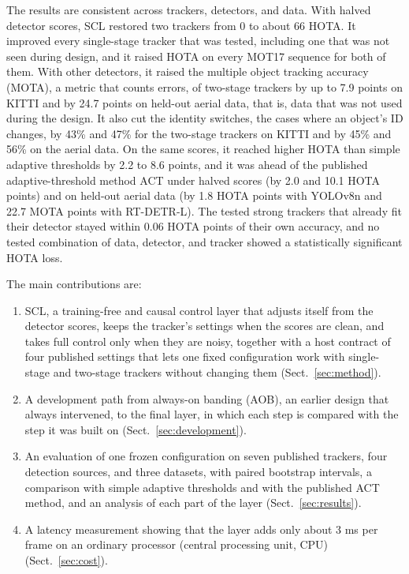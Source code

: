\documentclass[pdflatex,sn-mathphys-num,iicol]{sn-jnl}
\newcommand{\scl}{SCL}
\newcommand{\aob}{AOB}
\begin{document}
The results are consistent across trackers, detectors, and data. With halved detector scores,
\scl{} restored two trackers from 0 to about 66 HOTA. It improved every single-stage tracker that
was tested, including one that was not seen during design, and it raised HOTA on every MOT17
sequence for both of them. With other detectors, it raised the multiple object tracking accuracy
(MOTA), a metric that counts errors, of two-stage trackers by up to 7.9 points on KITTI and by 24.7
points on held-out aerial data, that is, data that was not used during the design. It also cut the
identity switches, the cases where an object's ID changes, by 43\% and 47\% for the two-stage
trackers on KITTI and by 45\% and 56\% on the aerial data. On the same scores, it reached higher
HOTA than simple adaptive thresholds by 2.2 to 8.6 points, and it was ahead of the published
adaptive-threshold method ACT under halved scores (by 2.0 and 10.1 HOTA points) and on held-out
aerial data (by 1.8 HOTA points with YOLOv8n and 22.7 MOTA points with RT-DETR-L). The tested strong
trackers that already fit their detector stayed within 0.06 HOTA points of their own accuracy, and
no tested combination of data, detector, and tracker showed a statistically significant HOTA loss.

The main contributions are:
\begin{enumerate}
\item \scl{}, a training-free and causal control layer that adjusts itself from the detector scores,
      keeps the tracker's settings when the scores are clean, and takes full control only when they
      are noisy, together with a host contract of four published settings that lets one fixed
      configuration work with single-stage and two-stage trackers without changing them
      (Sect.~\ref{sec:method}).
\item A development path from always-on banding (\aob{}), an earlier design that always
      intervened, to the final layer, in which each step is compared with the step it was built on
      (Sect.~\ref{sec:development}).
\item An evaluation of one frozen configuration on seven published trackers, four detection
      sources, and three datasets, with paired bootstrap intervals, a comparison with simple
      adaptive thresholds and with the published ACT method, and an analysis of each part of the
      layer (Sect.~\ref{sec:results}).
\item A latency measurement showing that the layer adds only about 3 ms per frame on an ordinary
      processor (central processing unit, CPU) (Sect.~\ref{sec:cost}).
\end{enumerate}
\end{document}
